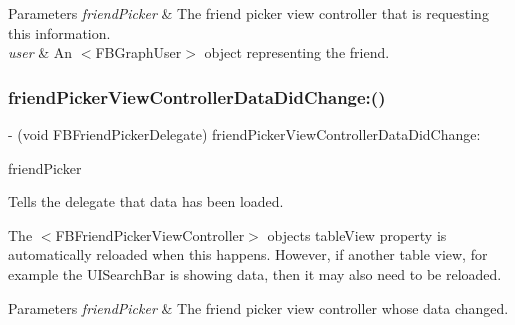 \begin{DoxyParams}{Parameters}
{\em friend\+Picker} & The friend picker view controller that is requesting this information. \\
\hline
{\em user} & An $<$\+F\+B\+Graph\+User$>$ object representing the friend. \\
\hline
\end{DoxyParams}
\mbox{\label{protocolFBFriendPickerDelegate_01-p_adb573d4fc9792d3dc05298f13bc41086}} 
\subsubsection{\texorpdfstring{friend\+Picker\+View\+Controller\+Data\+Did\+Change\+:()}{friendPickerViewControllerDataDidChange:()}\hspace{0.1cm}{\footnotesize\ttfamily [1/5]}}
{\footnotesize\ttfamily -\/ (void F\+B\+Friend\+Picker\+Delegate) friend\+Picker\+View\+Controller\+Data\+Did\+Change\+: \begin{DoxyParamCaption}\item[{(\hyperlink{interfaceFBFriendPickerViewController}{F\+B\+Friend\+Picker\+View\+Controller} $\ast$)}]{friend\+Picker }\end{DoxyParamCaption}\hspace{0.3cm}{\ttfamily [optional]}}

Tells the delegate that data has been loaded.

The $<$\+F\+B\+Friend\+Picker\+View\+Controller$>$ object\textquotesingle{}s {\ttfamily table\+View} property is automatically reloaded when this happens. However, if another table view, for example the {\ttfamily U\+I\+Search\+Bar} is showing data, then it may also need to be reloaded.


\begin{DoxyParams}{Parameters}
{\em friend\+Picker} & The friend picker view controller whose data changed. \\
\hline
\end{DoxyParams}
\mbox{\label{protocolFBFriendPickerDelegate_01-p_adb573d4fc9792d3dc05298f13bc41086}} 
